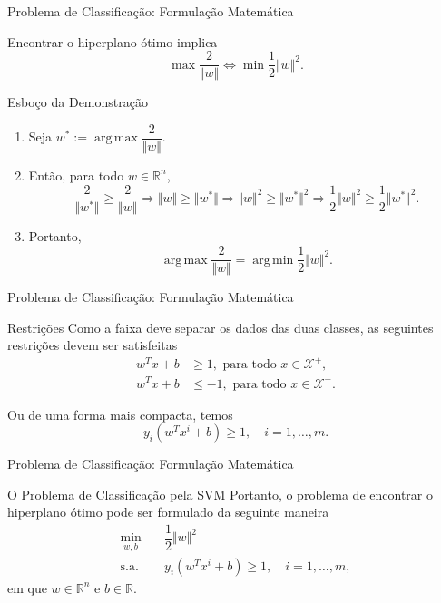 \documentclass{beamer}
\DeclareMathOperator*{\argmax}{arg\, max}
\DeclareMathOperator*{\argmin}{arg\, min}
\def\Xset{\mathcal{X}}
\def\RR{\mathds{R}}
\theoremstyle{definition}%
\begin{document}
\begin{frame}{Problema de Classificação: Formulação Matemática}
\begin{block}{}
Encontrar o hiperplano ótimo implica 
\[ \max \dfrac{2}{\Vert w\Vert}  \Longleftrightarrow \min \dfrac{1}{2}\Vert w\Vert^{2}. \]
\end{block}
\pause
\begin{exampleblock}{Esboço da Demonstração}
\begin{enumerate}

	\item Seja $w^{*}:=\argmax\dfrac{2}{\Vert w\Vert}$. 

	\item Então, para todo $w\in \RR^n$,
\[ \dfrac{2}{\Vert w^{*}\Vert} \geq \dfrac{2}{\Vert w\Vert} \Rightarrow \Vert w\Vert \geq \Vert w^{*}\Vert \Rightarrow \Vert w\Vert^{2} \geq \Vert w^{*}\Vert^{2} \Rightarrow \dfrac{1}{2}\Vert w\Vert^{2} \geq \dfrac{1}{2}\Vert w^{*}\Vert^{2}. \]

	\item Portanto,
\[ \argmax\dfrac{2}{\Vert w\Vert} = \argmin\dfrac{1}{2}\Vert w\Vert^2. \]
\end{enumerate}
\end{exampleblock}
\end{frame}


\begin{frame}{Problema de Classificação: Formulação Matemática}
\begin{block}{Restrições}
Como a faixa deve separar os dados das duas classes, as seguintes restrições devem ser satisfeitas
\begin{align}
w^{T}x+b &\geq 1 , \text{ para  todo } x\in \Xset^{+}, \\
w^{T}x+b &\leq -1 , \text{ para  todo } x\in \Xset^{-}.
\end{align}

Ou de uma forma mais compacta, temos
\[ y_{i}(w^{T}x^{i}+b)\geq 1, \quad i=1, \ldots ,m. \]
\end{block}
\end{frame}


\begin{frame}{Problema de Classificação: Formulação Matemática}
\begin{block}{O Problema de Classificação pela SVM}
Portanto, o problema de encontrar o hiperplano ótimo pode ser formulado da seguinte maneira
\[ \label{eq5}
\begin{aligned}
\min_{w,b} & \quad \dfrac{1}{2} \Vert w\Vert^{2} \\
\text{s.a.} &  \quad y_i(w^{T}x^{i}+b) \geq 1, \quad i=1, \ldots , m, \end{aligned}
\]
em que $w\in \RR^{n}$ e $b\in \RR$. 
\end{block}
\end{frame}
\end{document}
